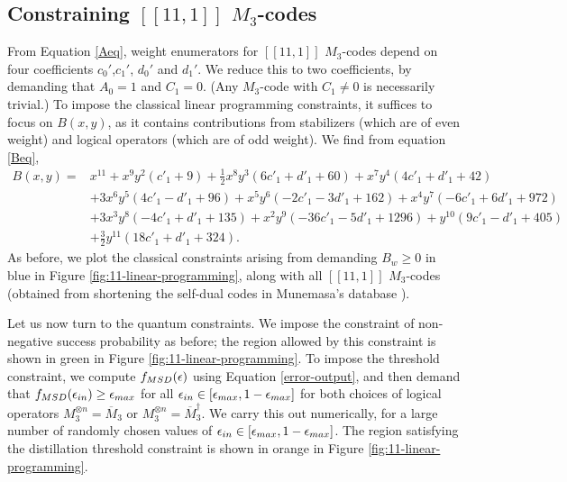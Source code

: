 \documentclass[11pt]{article}
\begin{document}
\subsection{Constraining $[[11,1]]$ $M_3$-codes} 
\label{sec:11-1}
From Equation \eqref{Aeq}, weight enumerators for $[[11,1]]$ $M_3$-codes depend on four coefficients $c_0'$,$c_1'$, $d_0'$ and $d_1'$. We reduce this to two coefficients, by demanding that $A_0=1$ and $C_{1}=0$. (Any $M_3$-code with $C_1 \neq 0$ is necessarily trivial.) To impose the classical linear programming constraints, it suffices to focus on $B(x,y)$, as it contains contributions from stabilizers (which are of even weight) and logical operators (which are of odd weight). We find from equation \eqref{Beq},
 \begin{align*}
   B(x,y) = &x^{11} + x^9y^2 \left( c'_1 + 9 \right) 
    + \frac{1}{2} x^8y^3 \left( 6c'_1 + d'_1 + 60 \right) 
    + x^7y^4 \left( 4c'_1 + d'_1 + 42 \right) \\
    &+ 3x^6y^5 \left( 4c'_1 - d'_1 + 96 \right) 
    + x^5y^6 \left( -2c'_1 - 3d'_1 + 162 \right) 
    + x^4y^7 \left( -6c'_1 + 6d'_1 + 972 \right) \\
    &+ 3x^3y^8 \left( -4c'_1 + d'_1 + 135 \right) 
    + x^{2}y^9 \left( -36c'_1 - 5d'_1 + 1296 \right) 
    + y^{10} \left( 9c'_1 - d'_1 + 405 \right) \\
    &+ \frac{3}{2} y^{11} \left( 18c'_1 + d'_1 + 324 \right).
\end{align*}
As before, we plot the classical constraints arising from demanding $B_w \geq 0$ in blue in Figure \ref{fig:11-linear-programming}, along with all $[[11,1]]$ $M_3$-codes (obtained from shortening the self-dual codes in Munemasa's database \cite{munemasa_codes_website}).

Let us now turn to the quantum constraints. We impose the constraint of non-negative success probability as before; the region allowed by this constraint is shown in green in Figure \ref{fig:11-linear-programming}. To impose the threshold constraint, we compute $f_{\rm MSD}(\epsilon)$ using Equation \eqref{error-output}, and then demand that $f_{MSD}(\epsilon_{\rm in}) \geq  \epsilon_{\rm max}$ for all $\epsilon_{\rm in} \in [\epsilon_{\rm max},1-\epsilon_{\rm max}]$ for both choices of logical operators $M_3^{\otimes n}=\overline{M}_3$ or $M_3^{\otimes n}=\overline{M}_3^\dagger$. We carry this out numerically, for a large number of randomly chosen values of $\epsilon_{\rm in} \in [\epsilon_{\rm max},1-\epsilon_{\rm max}]$. The region satisfying the distillation threshold constraint is shown in orange in Figure \ref{fig:11-linear-programming}.
\end{document}
